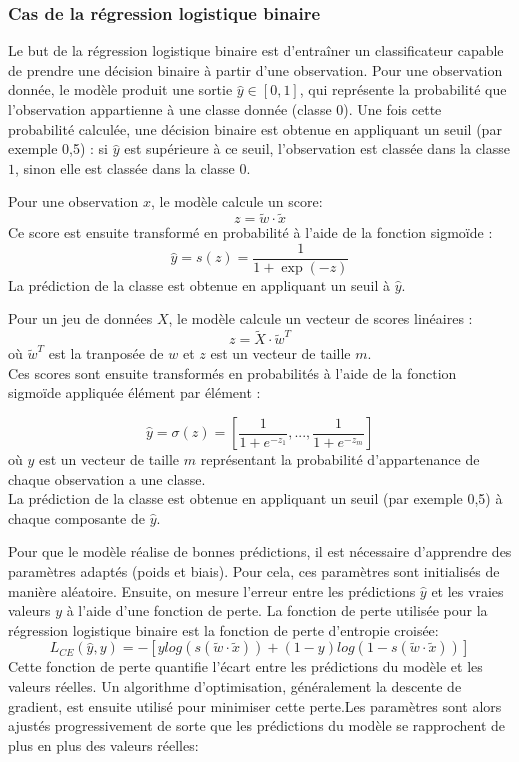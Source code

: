 \documentclass[12pt,a4paper]{report}
\begin{document}
	\subsubsection{Cas de la régression logistique binaire}
	
	Le but de la régression logistique binaire est d’entraîner un classificateur capable de prendre une décision binaire à partir d’une observation. Pour une observation donnée, le modèle produit une sortie $ \hat{y} \in [0,1] $, qui représente la probabilité que l’observation appartienne à une classe donnée (classe $0$). Une fois cette probabilité calculée, une décision binaire est obtenue en appliquant un seuil (par exemple 0,5) : si $\hat{y}$ est supérieure à ce seuil, l’observation est classée dans la classe $1$, sinon elle est classée dans la classe $0$.
	
	Pour une observation $x$, le modèle calcule un score:
	\[
	z = \tilde{w} \cdot \tilde{x}
	\]
	Ce score est ensuite transformé en probabilité à l’aide de la fonction sigmoïde :
	\[
	\hat{y} = s(z) = \frac{1}{1+\exp(-z)}
	\]
	La prédiction de la classe est obtenue en appliquant un seuil à $\hat{y}$.
	
	Pour un jeu de données $X$, le modèle calcule un vecteur de scores linéaires :
	\[
	z = \tilde{X} \cdot \tilde{w}^T
	\] 
	où $\tilde{w}^T$ est la tranposée de $w$ et $z$ est un vecteur de taille $m$.\\
	Ces scores sont ensuite transformés en probabilités à l’aide de la fonction sigmoïde appliquée élément par élément :
	
	\[
	\hat{y} = \sigma(z) = [\frac{1}{1 + e^{-z_1}}, ..., \frac{1}{1 + e^{-z_m}}]
	\]
	où $y$ est un vecteur de taille $m$ représentant la probabilité d'appartenance de chaque observation a une classe.\\
	La prédiction de la classe est obtenue en appliquant un seuil (par exemple 0,5) à chaque composante de $\hat{y}$.
	
	Pour que le modèle réalise de bonnes prédictions, il est nécessaire d’apprendre des paramètres adaptés (poids et biais). Pour cela, ces paramètres sont initialisés de manière aléatoire. Ensuite, on mesure l’erreur entre les prédictions $\hat{y}$ et les vraies valeurs $y$ à l’aide d’une fonction de perte. La fonction de perte utilisée pour la régression logistique binaire est la fonction de perte d'entropie croisée:
	\[
	L_{CE}(\hat{y}, y)=-[ylog(s(\tilde{w} \cdot \tilde{x}))+(1-y) log(1-s(\tilde{w} \cdot \tilde{x}))]
	\]
	Cette fonction de perte quantifie l’écart entre les prédictions du modèle et les valeurs réelles. Un algorithme d’optimisation, généralement la descente de gradient, est ensuite utilisé pour minimiser cette perte.Les paramètres sont alors ajustés progressivement de sorte que les prédictions du modèle se rapprochent de plus en plus des valeurs réelles:
	
\end{document}
